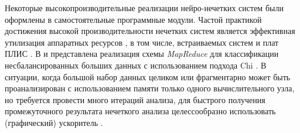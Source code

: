 Некоторые высокопроизводительные реализации нейро-нечетких систем были оформлены в самостоятельные программные модули. Частой практикой достижения высокой производительности нечетких систем является эффективная утилизация аппаратных ресурсов \cite{FuzzyLite}, в том числе, встраиваемых систем и плат ПЛИС \cite{Aldair2018}. В \cite{Lopez2015} и \cite{Elkano2017} представлена реализация схемы \textit{MapReduce} для классификации несбалансированных больших данных с использованием подхода Chi \cite{Chi1996}. В ситуации, когда большой набор данных целиком или фрагментарно может быть проанализирован с использованием памяти только одного вычислительного узла, но требуется провести много итераций анализа, для быстрого получения промежуточного результата нечеткого анализа целессообразно использовать (графический) ускоритель \cite{}.





